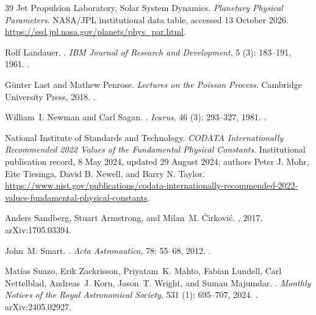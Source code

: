 \documentclass[11pt,a4paper]{article}
\theoremstyle{definition}\newtheorem{definition}{Definition}
\begin{document}
\begin{thebibliography}{39}
Jet Propulsion Laboratory, Solar System Dynamics.
\newblock \emph{Planetary Physical Parameters}.
\newblock NASA/JPL institutional data table, accessed 13 October 2026.
\newblock \url{https://ssd.jpl.nasa.gov/planets/phys_par.html}.

Rolf Landauer.
.
\newblock \emph{IBM Journal of Research and Development}, 5
  (3): 183--191, 1961.
\newblock {}.

G{\"u}nter Last and Mathew Penrose.
\newblock \emph{{Lectures on the {Poisson} Process}}.
\newblock Cambridge University Press, 2018.
\newblock {}.

William~I. Newman and Carl Sagan.
.
\newblock \emph{Icarus}, 46 (3): 293--327, 1981.
\newblock {}.

National Institute of Standards and Technology.
\newblock \emph{CODATA Internationally Recommended 2022 Values of the
Fundamental Physical Constants}.
\newblock Institutional publication record, 8 May 2024, updated 29 August
2024; authors Peter J. Mohr, Eite Tiesinga, David B. Newell, and Barry N. Taylor.
\newblock \url{https://www.nist.gov/publications/codata-internationally-recommended-2022-values-fundamental-physical-constants}.

Anders Sandberg, Stuart Armstrong, and Milan~M. {\'C}irkovi{\'c}.
, 2017.
\newblock arXiv:1705.03394.

John~M. Smart.
.
\newblock \emph{Acta Astronautica}, 78: 55--68, 2012.
\newblock {}.

Mat\'ias Suazo, Erik Zackrisson, Priyatam~K. Mahto, Fabian Lundell, Carl
  Nettelblad, Andreas~J. Korn, Jason~T. Wright, and Suman Majumdar.
.
\newblock \emph{Monthly Notices of the Royal Astronomical Society},
  531 (1): 695--707, 2024.
\newblock {}.
\newblock arXiv:2405.02927.


\end{thebibliography}
\end{document}
